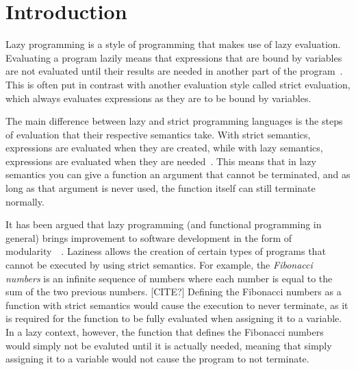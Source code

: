 \chapter{Introduction}
Lazy programming is a style of programming that makes use of lazy evaluation.
Evaluating a program lazily means that expressions that are bound by variables
are not evaluated until their results are needed in another part of the
program~\cite{Lazyeval6:online}. This is often put in contrast with another
evaluation style called strict evaluation, which always evaluates expressions
as they are to be bound by variables. 

The main difference between lazy and strict programming languages is the steps
of evaluation that their respective semantics take. With strict semantics,
expressions are evaluated when they are created, while with lazy semantics,
expressions are evaluated when they are needed~\cite{ThunkHas27:online}.
This means that in lazy semantics
you can give a function an argument that cannot be terminated, and as long as
that argument is never used, the function itself can still terminate normally.

It has been argued that lazy programming (and functional programming in general)
brings improvement to software development in the form of
modularity~\cite{Hu1989}~\cite{Hu2015}. Laziness allows the creation of certain
types of programs that cannot be executed by using strict semantics.
For example, the \textit{Fibonacci numbers} is an infinite sequence of numbers
where each number is equal to the sum of the two previous numbers. [CITE?]
Defining the Fibonacci numbers as a function with strict semantics would cause
the execution to never terminate, as it is required for the function to be
fully evaluated when assigning it to a variable. In a lazy context, however,
the function that defines the Fibonacci numbers would simply not be evaluted
until it is actually needed, meaning that simply assigning it to a variable
would not cause the program to not terminate.

